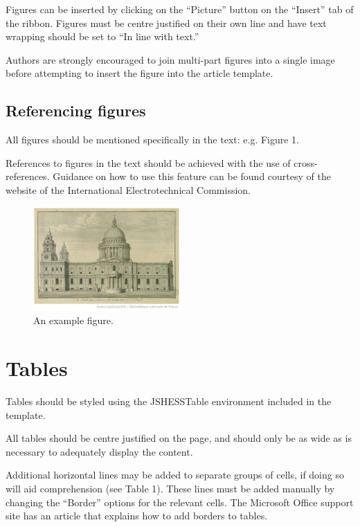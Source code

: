 \documentclass[10pt]{article}
\begin{document}
Figures can be inserted by clicking on the ``Picture'' button on the ``Insert'' tab of the ribbon. Figures must be centre justified on their own line and have text wrapping should be set to ``In line with text.''

Authors are strongly encouraged to join multi-part figures into a single image before attempting to insert the figure into the article template.

\subsection{Referencing figures}
\label{referencing_figures}
All figures should be mentioned specifically in the text: e.g. Figure 1.

References to figures in the text should be achieved with the use of cross-references. Guidance on how to use this feature can be found courtesy of the website of the International Electrotechnical Commission.

\begin{figure}
  \centering
    \caption{An example figure.}
    \label{figure:exampleFigure}
    \includegraphics[keepaspectratio=true,width=0.5\textwidth]{example_figure.png}
\end{figure}

\section{Tables}
\label{tables}
Tables should be styled using the JSHESSTable environment included in the template.

All tables should be centre justified on the page, and should only be as wide as is necessary to adequately display the content.

Additional horizontal lines may be added to separate groups of cells, if doing so will aid comprehension (see Table 1). These lines must be added manually by changing the “Border” options for the relevant cells. The Microsoft Office support site has an article that explains how to add borders to tables.
\end{document}
